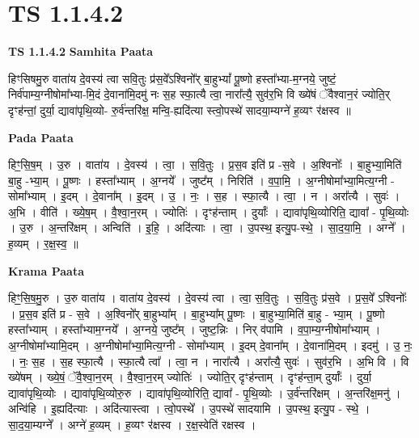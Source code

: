\documentclass[17pt]{extarticle}
\begin{document}
\section*{ TS 1.1.4.2 }

\textbf{TS 1.1.4.2 } \newline
\textbf{Samhita Paata} \newline

हिꣳसिषमु॒रु वाता॑य दे॒वस्य॑ त्वा सवि॒तुः प्र॑स॒वे᳚ऽश्विनो᳚र् बा॒हुभ्यां᳚ पू॒ष्णो हस्ता᳚भ्या-म॒ग्नये॒ जुष्टं॒ निर्व॑पाम्य॒ग्नीषोमा᳚भ्या-मि॒दं दे॒वाना॑मि॒दमु॑ नः स॒ह स्फा॒त्यै त्वा॒ नारा᳚त्यै॒ सुव॑र॒भि वि ख्ये॑षं ॅवैश्वान॒रं ज्योति॒र् दृꣳह॑न्तां॒ दुर्या॒ द्यावा॑पृथि॒व्यो- रु॒र्व॑न्तरि॑क्ष॒ मन्वि॒-ह्यदि॑त्या स्त्वो॒पस्थे॑ सादया॒म्यग्ने॑ ह॒व्यꣳ र॑क्षस्व ॥ \newline

\textbf{Pada Paata} \newline

हिꣳ॒॒सि॒ष॒म् । उ॒रु । वाता॑य । दे॒वस्य॑ । त्वा॒ । स॒वि॒तुः । प्र॒स॒व इति॑ प्र -स॒वे । अ॒श्विनोः᳚ । बा॒हुभ्या॒मिति॑ बा॒हु -भ्या॒म् । पू॒ष्णः । हस्ता᳚भ्याम् । अ॒ग्नये᳚ । जुष्ट᳚म् । निरिति॑ । व॒पा॒मि॒ । अ॒ग्नीषोमा᳚भ्या॒मित्य॒ग्नी - सोमा᳚भ्याम् । इ॒दम् । दे॒वाना᳚म् । इ॒दम् । उ॒ । नः॒ । स॒ह । स्फा॒त्यै । त्वा॒ । न । अरा᳚त्यै । सुवः॑ । अ॒भि । वीति॑ । ख्ये॒ष॒म् । वै॒श्वा॒न॒रम् । ज्योतिः॑ । दृꣳह॑न्ताम् । दुर्याः᳚ । द्यावा॑पृथि॒व्योरिति॒ द्यावा᳚ - पृ॒थि॒व्योः । उ॒रु । अ॒न्तरि॑क्षम् । अन्विति॑ । इ॒हि॒ । अदि॑त्याः । त्वा॒ । उ॒पस्थ॒ इत्यु॒प-स्थे॒ । सा॒द॒या॒मि॒ । अग्ने᳚ । ह॒व्यम् । र॒क्ष॒स्व॒ ॥  \newline


\textbf{Krama Paata} \newline

हिꣳ॒॒॒सि॒ष॒मु॒रु । उ॒रु वाता॑य । वाता॑य दे॒वस्य॑ । दे॒वस्य॑ त्वा । त्वा॒ स॒वि॒तुः । स॒वि॒तुः प्र॑स॒वे । प्र॒स॒वे᳚ ऽश्विनोः᳚ । प्र॒स॒व इति॑ प्र - स॒वे । अ॒श्विनो᳚र् बा॒हुभ्या᳚म् । बा॒हुभ्या᳚म् पू॒ष्णः । बा॒हुभ्या॒मिति॑ बा॒हु - भ्या॒म् । पू॒ष्णो हस्ता᳚भ्याम् । हस्ता᳚भ्याम॒ग्नये᳚ । अ॒ग्नये॒ जुष्ट᳚म् । जुष्ट॒न्निः । निर् व॑पामि । व॒पा॒म्य॒ग्नीषोमा᳚भ्याम् । अ॒ग्नीषोमा᳚भ्यामि॒दम् । अ॒ग्नीषोमा᳚भ्या॒मित्य॒ग्नी - सोमा᳚भ्याम् । इ॒दम् दे॒वाना᳚म् । दे॒वाना॑मि॒दम् । इदमु॑ । उ॒ नः॒ । नः॒ स॒ह । स॒ह स्फा॒त्यै । स्फा॒त्यै त्वा᳚ । त्वा॒ न । नारा᳚त्यै । अरा᳚त्यै॒ सुवः॑ । सुव॑र॒भि । अ॒भि वि । वि ख्ये॑षम् । ख्ये॒षं॒ ॅवै॒श्वा॒न॒रम् । वै॒श्वा॒न॒रम् ज्योतिः॑ । ज्योति॒र् दृꣳह॑न्ताम् । दृꣳह॑न्ता॒म् दुर्याः᳚ । दुर्या॒ द्यावा॑पृथि॒व्योः । द्यावा॑पृथि॒व्योरु॒रु । द्यावा॑पृथि॒व्योरिति॒ द्यावा᳚ - पृ॒थि॒व्योः । उ॒र्व॑न्तरि॑क्षम् । अ॒न्तरि॑क्ष॒मनु॑ । अन्वि॑हि । इ॒ह्यदि॑त्याः । 
अदि॑त्यास्त्वा । त्वो॒पस्थे᳚ । उ॒पस्थे॑ सादयामि । उ॒पस्थ॒ इत्यु॒प - स्थे॒ । सा॒द॒या॒म्यग्ने᳚ । अग्ने॑ ह॒व्यम् । ह॒व्यꣳ र॑क्षस्व । र॒क्ष॒स्वेति॑ रक्षस्व । \newline
\end{document}

